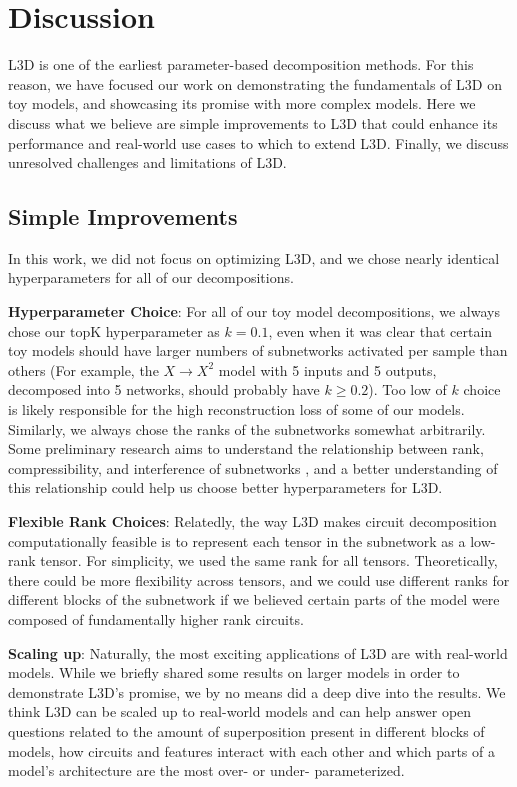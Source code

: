 \documentclass{article}
\theoremstyle{plain}
\theoremstyle{definition}
\theoremstyle{remark}
\begin{document}
\section{Discussion}

L3D is one of the earliest parameter-based decomposition methods. For this reason, we have focused our work on demonstrating the fundamentals of L3D on toy models, and showcasing its promise with more complex models. Here we discuss what we believe are simple improvements to L3D that could enhance its performance and real-world use cases to which to extend L3D. Finally, we discuss unresolved challenges and limitations of L3D. 

\subsection{Simple Improvements}
In this work, we did not focus on optimizing L3D, and we chose nearly identical hyperparameters for all of our decompositions. 

\textbf{Hyperparameter Choice}: For all of our toy model decompositions, we always chose our $\text{topK}$ hyperparameter as $k=0.1$, even when it was clear that certain toy models should have larger numbers of subnetworks activated per sample than others (For example, the $X \rightarrow X^2$ model with 5 inputs and 5 outputs, decomposed into 5 networks, should probably have $k \geq 0.2$). Too low of $k$ choice is likely responsible for the high reconstruction loss of some of our models. Similarly, we always chose the ranks of the subnetworks somewhat arbitrarily. Some preliminary research aims to understand the relationship between rank, compressibility, and interference of subnetworks \cite{hanni2024mathematical,bushnaq2024circuits}, and a better understanding of this relationship could help us choose better hyperparameters for L3D. 

\textbf{Flexible Rank Choices}: Relatedly, the way L3D makes circuit decomposition computationally feasible is to represent each tensor in the subnetwork as a low-rank tensor. For simplicity, we used the same rank for all tensors. Theoretically, there could be more flexibility across tensors, and we could use different ranks for different blocks of the subnetwork if we believed certain parts of the model were composed of fundamentally higher rank circuits. 

\textbf{Scaling up}: Naturally, the most exciting applications of L3D are with real-world models. While we briefly shared some results on larger models in order to demonstrate L3D's promise, we by no means did a deep dive into the results. We think L3D can be scaled up to real-world models and can help answer open questions related to the amount of superposition present in different blocks of models, how circuits and features interact with each other and which parts of a model's architecture are the most over- or under- parameterized. 
\end{document}
